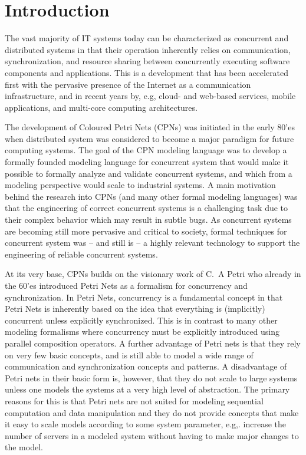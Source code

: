 \section{Introduction}

The vast majority of IT systems today can be characterized as
concurrent and distributed systems in that their operation inherently
relies on communication, synchronization, and resource sharing between
concurrently executing software components and applications. This is a
development that has been accelerated first with the pervasive
presence of the Internet as a communication infrastructure, and in
recent years by, e.g, cloud- and web-based services, mobile
applications, and multi-core computing architectures.


The development of Coloured Petri Nets (CPNs) was initiated in the
early 80'es when distributed system was considered to become a major
paradigm for future computing systems. The goal of the CPN modeling
language was to develop a formally founded modeling language for
concurrent system that would make it possible to formally analyze and
validate concurrent systems, and which from a modeling perspective
would scale to industrial systems. A main motivation behind the
research into CPNs (and many other formal modeling languages) was
that the engineering of correct concurrent systems is a challenging
task due to their complex behavior which may result in subtle bugs. As
concurrent systems are becoming still more pervasive and critical to
society, formal techniques for concurrent system was -- and still is
-- a highly relevant technology to support the engineering of reliable
concurrent systems.


At its very base, CPNs builds on the visionary work of C.~A Petri
\cite{X} who already in the 60'es introduced Petri Nets as a formalism
for concurrency and synchronization. In Petri Nets, concurrency is a
fundamental concept in that Petri Nets is inherently based on the idea
that everything is (implicitly) concurrent unless explicitly
synchronized. This is in contrast to many other modeling formalisms
where concurrency must be explicitly introduced using parallel
composition operators. A further advantage of Petri nets is that they
rely on very few basic concepts, and is still able to model a wide
range of communication and synchronization concepts and patterns. A
disadvantage of Petri nets in their basic form is, however, that they
do not scale to large systems unless one models the systems at a very
high level of abstraction. The primary reasons for this is that Petri
nets are not suited for modeling sequential computation and data
manipulation and they do not provide concepts that make it easy to
scale models according to some system parameter, e.g,. increase the
number of servers in a modeled system without having to make major
changes to the model.

